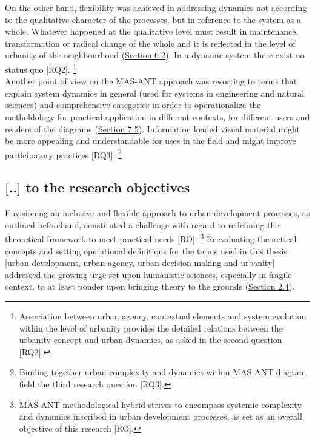 \documentclass[11pt]{report}
\begin{document}
{On the other hand, flexibility was achieved in addressing dynamics not according to the qualitative character of the processes, but in reference to the system as a whole. Whatever happened at the qualitative level must result in maintenance, transformation or radical change of the whole and it is reflected in the level of urbanity of the neighbourhood (\href{Section 6.2}{Section 6.2}). In a dynamic system there exist no status quo [RQ2].
\footnote{Association between urban agency, contextual elements and system evolution within the level of urbanity provides the detailed relations between the urbanity concept and urban dynamics, as asked in the second question [RQ2].}
\\

Another point of view on the MAS-ANT approach was resorting to terms that explain system dynamics in general (used for systems in engineering and natural sciences) and comprehensive categories in order to operationalize the metholdology for practical application in different contexts, for different users and readers of the diagrams (\href{Section 7.5}{Section 7.5}).
Information loaded visual material might be more appealing and understandable for uses in the field and might improve participatory practices [RQ3].
\footnote{Binding together urban complexity and dynamics within MAS-ANT diagram field the third research question [RQ3].}

\subsection{[..] to the research objectives}

Envisioning an inclusive and flexible approach to  urban development processes, as outlined beforehand, constituted a challenge with regard to redefining the theoretical framework to meet practical needs [RO].
\footnote{MAS-ANT methodological hybrid strives to encompass  systemic complexity and dynamics inscribed in urban development processes, as set as an overall objective of this research [RO].}
Reevaluating theoretical concepts and setting operational definitions for the terms used in this thesis [urban development, urban agency, urban decision-making and urbanity] addressed the growing urge set upon humanistic sciences, especially in fragile context, to at least ponder upon bringing theory to the grounds (\href{Section 2.4}{Section 2.4}).
\\

}
\end{document}
